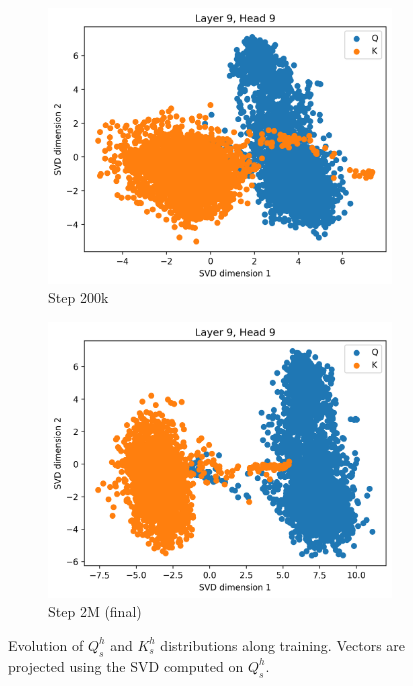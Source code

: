 \begin{appendices}
\begin{figure}[ht]
    \begin{subfigure}[b]{0.24\linewidth}
         \includegraphics[width=\linewidth]{sources/part_1/anisotropy/imgs/dist_l9h9_s200_Q.png}
         \caption{Step 200k}
         \label{fig:dist_qk_s200_Q}
    \end{subfigure}
    \begin{subfigure}[b]{0.24\linewidth}
         \includegraphics[width=\linewidth]{sources/part_1/anisotropy/imgs/dist_l9h9_s2000_Q.png}
         \caption{Step 2M (final)}
         \label{fig:dist_qk_s2M_Q}
    \end{subfigure}
    \caption{Evolution of $Q^h_s$ and $K^h_s$ distributions along training. Vectors are projected using the SVD computed on $Q^h_s$.}
    \label{fig:proj_qk_heads_Q}
\end{figure}


\end{appendices}
